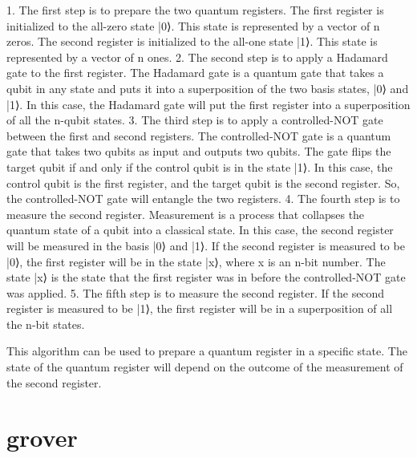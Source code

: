 \documentclass{book}
\begin{document}
1. The first step is to prepare the two quantum registers. The first register is initialized to the all-zero state |0⟩. This state is represented by a vector of n zeros. The second register is initialized to the all-one state |1⟩. This state is represented by a vector of n ones.
2. The second step is to apply a Hadamard gate to the first register. The Hadamard gate is a quantum gate that takes a qubit in any state and puts it into a superposition of the two basis states, |0⟩ and |1⟩. In this case, the Hadamard gate will put the first register into a superposition of all the n-qubit states.
3. The third step is to apply a controlled-NOT gate between the first and second registers. The controlled-NOT gate is a quantum gate that takes two qubits as input and outputs two qubits. The gate flips the target qubit if and only if the control qubit is in the state |1⟩. In this case, the control qubit is the first register, and the target qubit is the second register. So, the controlled-NOT gate will entangle the two registers.
4. The fourth step is to measure the second register. Measurement is a process that collapses the quantum state of a qubit into a classical state. In this case, the second register will be measured in the basis |0⟩ and |1⟩. If the second register is measured to be |0⟩, the first register will be in the state |x⟩, where x is an n-bit number. The state |x⟩ is the state that the first register was in before the controlled-NOT gate was applied.
5. The fifth step is to measure the second register. If the second register is measured to be |1⟩, the first register will be in a superposition of all the n-bit states.

This algorithm can be used to prepare a quantum register in a specific state. The state of the quantum register will depend on the outcome of the measurement of the second register.	
	

	
	
\section{grover}	
	
	
	
	
	
	
	
\end{document}
